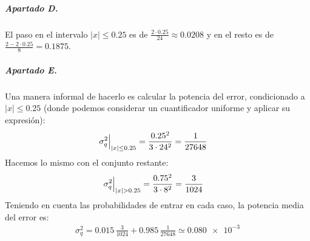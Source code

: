 \subparagraph{Apartado D.}

El paso en el intervalo $\left|x\right| \leq \num{0.25}$ es de
$\frac{2 \cdot \num{0.25}}{24} \approx \num{0.0208}$ y en el resto es de
$\frac{2 - 2 \cdot \num{0.25}}{8} = \num{0.1875}$.

\subparagraph{Apartado E.}

Una manera informal de hacerlo es calcular la potencia del error,
condicionado a $\left|x\right| \leq \num{0.25}$ (donde podemos considerar un
cuantificador uniforme y aplicar su expresión):
%
\begin{align*}
  \Bigl. \sigma_q^2 \Bigr|_{\left|x\right| \leq \num{0.25}}
    &= \frac{\num{.25}^2}{3 \cdot 24^2} = \frac{1}{27648}
\end{align*}
%
Hacemos lo mismo con el conjunto restante:
%
\begin{align*}
  \Bigl. \sigma_q^2 \Bigr|_{\left|x\right| > \num{0.25}}
    &= \frac{\num{.75}^2}{3 \cdot 8^2} = \frac{3}{1024}
\end{align*}
%
Teniendo en cuenta las probabilidades de entrar en cada caso,
la potencia media del error es:
%
\begin{align*}
  \sigma_q^2 = \num{0.015} \, \frac{3}{1024} + \num{0.985} \, \frac{1}{27648}
             \simeq \num{0.080e-3}
\end{align*}

\finishpage

